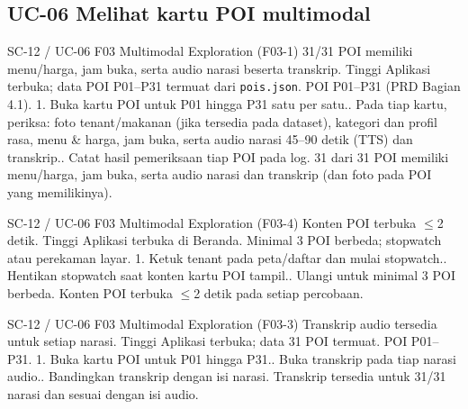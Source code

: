 \subsection*{UC-06 Melihat kartu POI multimodal}

\renewcommand{\tcactual}{Sesuai ekspektasi pada perangkat Android (Lolos via \texttt{02-poi-dataset} (21/21) \& \texttt{03-multimodal} (12/12)). 31 dari 31 POI memiliki menu/harga, jam buka, serta audio narasi dan transkrip (dan foto pada POI yang memilikinya).}
{SC-12 / UC-06}
{F03 Multimodal Exploration}
{(F03-1) 31/31 POI memiliki menu/harga, jam buka, serta audio narasi beserta transkrip.}
{Tinggi}
{Aplikasi terbuka; data POI P01--P31 termuat dari \texttt{pois.json}.}
{POI P01--P31 (PRD Bagian 4.1).}
{1. Buka kartu POI untuk P01 hingga P31 satu per satu.. Pada tiap kartu, periksa: foto tenant/makanan (jika tersedia pada dataset), kategori dan profil rasa, menu \& harga, jam buka, serta audio narasi 45--90 detik (TTS) dan transkrip.. Catat hasil pemeriksaan tiap POI pada log.}
{31 dari 31 POI memiliki menu/harga, jam buka, serta audio narasi dan transkrip (dan foto pada POI yang memilikinya).}

\renewcommand{\tcactual}{Sesuai ekspektasi pada perangkat Android. Konten POI terbuka \(\le\)2 detik pada setiap percobaan.}
{SC-12 / UC-06}
{F03 Multimodal Exploration}
{(F03-4) Konten POI terbuka \(\le\)2 detik.}
{Tinggi}
{Aplikasi terbuka di Beranda.}
{Minimal 3 POI berbeda; stopwatch atau perekaman layar.}
{1. Ketuk tenant pada peta/daftar dan mulai stopwatch.. Hentikan stopwatch saat konten kartu POI tampil.. Ulangi untuk minimal 3 POI berbeda.}
{Konten POI terbuka \(\le\)2 detik pada setiap percobaan.}

\renewcommand{\tcactual}{Sesuai ekspektasi pada perangkat Android (Lolos via \texttt{02-poi-dataset} (21/21) \& \texttt{03-multimodal} (12/12)). Transkrip tersedia untuk 31/31 narasi dan sesuai dengan isi audio.}
{SC-12 / UC-06}
{F03 Multimodal Exploration}
{(F03-3) Transkrip audio tersedia untuk setiap narasi.}
{Tinggi}
{Aplikasi terbuka; data 31 POI termuat.}
{POI P01--P31.}
{1. Buka kartu POI untuk P01 hingga P31.. Buka transkrip pada tiap narasi audio.. Bandingkan transkrip dengan isi narasi.}
{Transkrip tersedia untuk 31/31 narasi dan sesuai dengan isi audio.}

